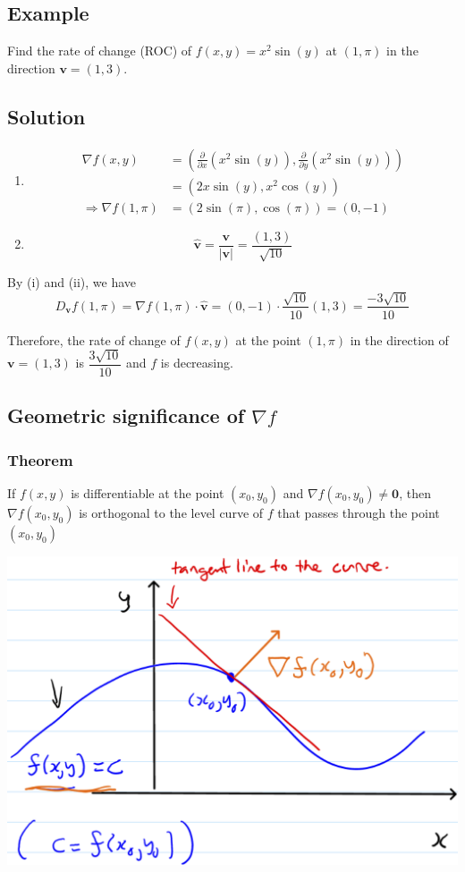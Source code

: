 \documentclass[11pt]{article}
\renewcommand{\vec}[1]{\mathbf{#1}}
\begin{document}
\subsection{Example}
Find the rate of change (ROC) of $f(x, y) = x^2 \sin(y)$ at $(1, \pi)$ in the direction $\vec{v} = (1, 3)$.

\subsection{Solution}
\begin{enumerate}[ (i) ]
\item \begin{align*}
\nabla f(x, y) &= \left( \frac{\partial}{\partial x} \left( x^2 \sin(y) \right), \frac{\partial}{\partial y} \left( x^2 \sin(y) \right) \right) \\
&= \left(2x \sin(y), x^2 \cos(y) \right) \\
\Rightarrow \nabla f(1, \pi) &= (2 \sin(\pi), \cos(\pi)) = (0, -1)
\end{align*}
\item \[ \vec{\hat{v}} = \frac{\vec{v}}{|\vec{v}|} = \frac{(1, 3)}{\sqrt{10}} \]
\end{enumerate}

By (i) and (ii), we have
\[ D_\vec{v} f(1, \pi) = \nabla f(1, \pi) \cdot \vec{\hat{v}} = (0, -1) \cdot \frac{\sqrt{10}}{10}(1, 3) = \frac{-3 \sqrt{10}}{10} \]

Therefore, the rate of change of $f(x,y)$ at the point $(1, \pi)$ in the direction of $\vec{v} = (1, 3)$ is $\dfrac{3\sqrt{10}}{10}$ and $f$ is decreasing.

\subsection{Geometric significance of $\nabla f$}
\subsubsection{Theorem}
If $f(x, y)$ is differentiable at the point $(x_0, y_0)$ and $\nabla f(x_0, y_0) \not = \vec{0} $, then $\nabla f(x_0, y_0)$ is orthogonal to the level curve of $f$ that passes through the point $(x_0, y_0)$

\begin{center} \includegraphics[scale=0.75]{derivative_level_curve} \end{center}
\end{document}
